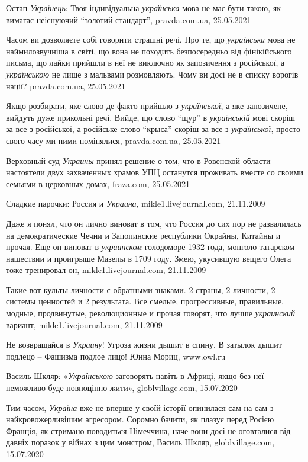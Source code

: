 Остап \emph{Українець}: Твоя індивідуальна \emph{українська} мова не має бути такою, як
вимагає неіснуючий \enquote{золотий стандарт}, pravda.com.ua, 25.05.2021

Часом ви дозволяєте собі говорити страшні речі. Про те, що \emph{українська}
мова не наймилозвучніша в світі, що вона не походить безпосередньо від
фінікійського письма, що лайки прийшли в неї не виключно як запозичення з
російської, а \emph{українською} не лише з мальвами розмовляють. Чому ви досі
не в списку ворогів нації? pravda.com.ua, 25.05.2021

Якщо розбирати, яке слово де-факто прийшло з \emph{української}, а яке
запозичене, вийдуть дуже прикольні речі. Вийде, що слово \enquote{щур} в
\emph{українській} мові скоріш за все з російської, а російське слово
\enquote{крыса} скоріш за все з \emph{української}, просто свого часу ми ними
помінялися, pravda.com.ua, 25.05.2021

Верховный суд \emph{Украины} принял решение о том, что в Ровенской области настоятели
двух захваченных храмов УПЦ останутся проживать вместе со своими семьями в
церковных домах, fraza.com, 25.05.2021

Сладкие парочки: Россия и \emph{Украина}, mikle1.livejournal.com, 21.11.2009

Даже я понял, что он лично виноват в том, что Россия до сих пор не развалилась
на демократические Чечни и Запопинские республики Окрайны, Китайны и прочая.
Еще он виноват в \emph{украинском} голодоморе 1932 года, монголо-татарском
нашествии и проигрыше Мазепы в 1709 году. Змею, укусившую вещего Олега тоже
тренировал он, mikle1.livejournal.com, 21.11.2009

Такие вот культы личности с обратными знаками. 2 страны, 2 личности, 2 системы
ценностей и 2 результата. Все смелые, прогрессивные, правильные, модные,
продвинутые, революционные и прочая говорят, что лучше \emph{украинский}
вариант, mikle1.livejournal.com, 21.11.2009

Не возвращайся в \emph{Украину}!  Угроза жизни дышит в спину, В затылок дышит
подлецо – Фашизма подлое лицо! Юнна Мориц, www.owl.ru

Василь Шкляр: «\emph{Українською} заговорять навіть в Африці, якщо без неї неможливо
буде повноцінно жити», globlvillage.com, 15.07.2020

Тим часом, \emph{Україна} вже не вперше у своїй історії опинилася сам на сам з
найкровожерливішим агресором. Соромно бачити, як плазує перед Росією Франція,
як стримано поводиться Німеччина, наче вони досі не оговталися від давніх
поразок у війнах з цим монстром, Василь Шкляр, globlvillage.com, 15.07.2020

